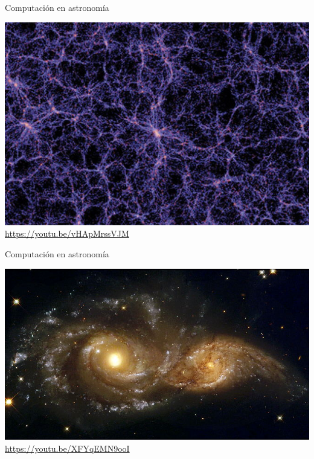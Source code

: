 \documentclass[10pt,xcolor={dvipsnames}]{beamer}
\begin{document}
\begin{frame}{Computación en astronomía}
\begin{center}
\includegraphics[scale=0.13]{Figures/SimMilenio} \pause
\url{https://youtu.be/vHApMrssVJM}
\end{center}
\end{frame}


\begin{frame}{Computación en astronomía}
\begin{center}
\includegraphics[scale=0.5]{Figures/colisgal} \pause
\url{https://youtu.be/XFYqEMN9ooI}
\end{center}
\end{frame}
\end{document}
